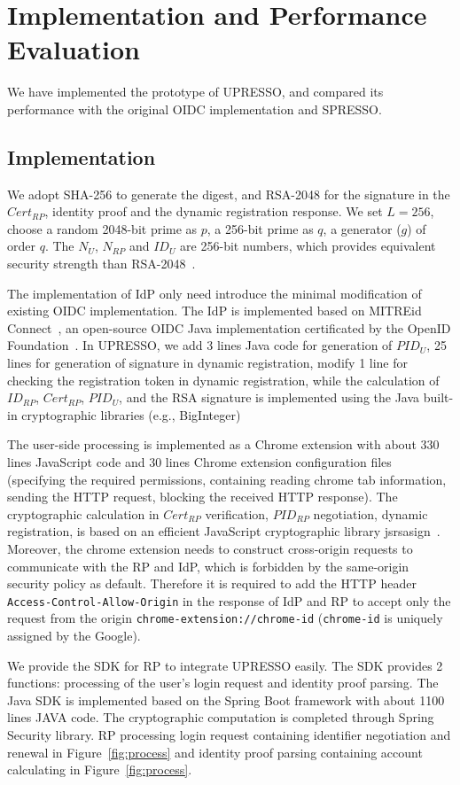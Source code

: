 \section{Implementation and Performance Evaluation}
\label{sec:implementation}
We have implemented the prototype of UPRESSO, and compared its performance with the original OIDC implementation and SPRESSO.

\subsection{Implementation}
We adopt SHA-256 to generate the digest, and  RSA-2048 for the signature in  the $Cert_{RP}$, identity proof and the dynamic registration response. We set $L=256$,  choose a random 2048-bit prime as $p$, a 256-bit prime as $q$, a generator ($g$) of order $q$. The  $N_U$, $N_{RP}$ and $ID_U$  are 256-bit numbers, which provides equivalent security strength than RSA-2048~\cite{barkerecommendation}.

The implementation of IdP only need introduce the minimal modification of existing OIDC implementation. The IdP is implemented based on MITREid Connect~\cite{MITREid}, an open-source OIDC Java implementation certificated by the OpenID Foundation~\cite{OIDF}.
In UPRESSO, we add 3 lines Java code for generation of $PID_U$, 25 lines for generation of signature in dynamic registration, modify 1 line for checking the registration token in dynamic registration, while the calculation of $ID_{RP}$, $Cert_{RP}$,  $PID_U$, and the RSA signature is implemented using the Java built-in cryptographic libraries (e.g., BigInteger)

The user-side processing is implemented as a Chrome extension with about 330 lines JavaScript code and 30 lines  Chrome extension configuration files (specifying the required permissions, containing reading chrome tab information, sending the HTTP request, blocking the received HTTP response). The cryptographic calculation in $Cert_{RP}$ verification, $PID_{RP}$ negotiation, dynamic registration, is based on an efficient JavaScript cryptographic library  jsrsasign~\cite{jsrsasign}.
Moreover, the chrome extension needs to construct cross-origin requests to communicate with the RP and IdP, which is forbidden by the same-origin security policy as default. Therefore it is required to add the HTTP header \verb+Access-Control-Allow-Origin+ in the response of IdP and RP to accept only the request from the origin \verb+chrome-extension://chrome-id+ (\verb+chrome-id+ is uniquely assigned by the Google).

We provide the SDK for RP to integrate UPRESSO easily. The SDK provides 2 functions:
processing of the user's login request and  identity proof parsing. The Java SDK is implemented based on the Spring Boot framework  with about 1100 lines JAVA code. The cryptographic computation is completed through Spring Security library.
RP processing login request containing identifier negotiation and renewal in Figure~\ref{fig:process} and identity proof parsing containing account calculating in Figure~\ref{fig:process}.

